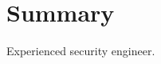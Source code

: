 \documentclass{article}
\newcommand{\cvsection}[2]{\section*{#1}#2}
\newcommand{\BodyStyle}{}
\newcommand{\RaggedRight}{}
\begin{document}
\cvsection{Summary}
{\BodyStyle\RaggedRight
Experienced security engineer.\par}
\end{document}

